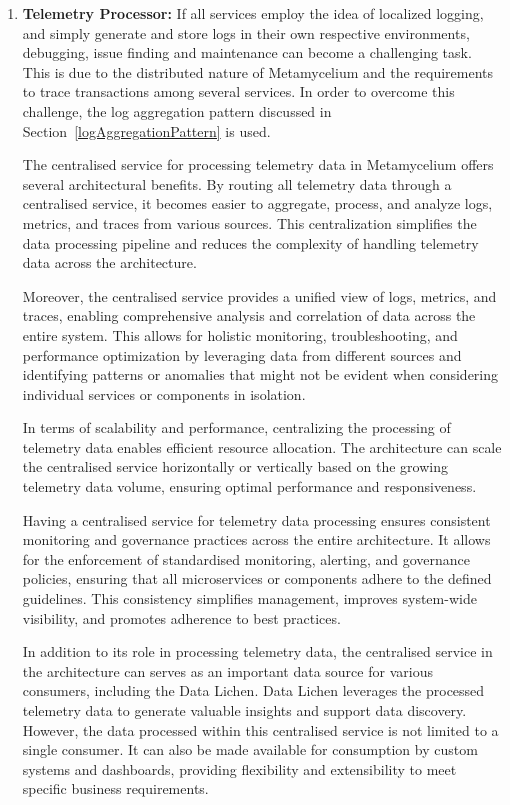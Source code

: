 \documentclass[preprint,12pt]{elsarticle}
\begin{document}
\begin{enumerate}
    \item \textbf{Telemetry Processor:} If all services employ the idea of localized logging, and simply generate and store logs in their own respective environments, debugging, issue finding and maintenance can become a challenging task. This is due to the distributed nature of Metamycelium and the requirements to trace transactions among several services. In order to overcome this challenge, the log aggregation pattern discussed in Section~\ref{logAggregationPattern} is used.
    
    The centralised service for processing telemetry data in Metamycelium offers several architectural benefits. By routing all telemetry data through a centralised service, it becomes easier to aggregate, process, and analyze logs, metrics, and traces from various sources. This centralization simplifies the data processing pipeline and reduces the complexity of handling telemetry data across the architecture.

    Moreover, the centralised service provides a unified view of logs, metrics, and traces, enabling comprehensive analysis and correlation of data across the entire system. This allows for holistic monitoring, troubleshooting, and performance optimization by leveraging data from different sources and identifying patterns or anomalies that might not be evident when considering individual services or components in isolation.

    In terms of scalability and performance, centralizing the processing of telemetry data enables efficient resource allocation. The architecture can scale the centralised service horizontally or vertically based on the growing telemetry data volume, ensuring optimal performance and responsiveness.

    Having a centralised service for telemetry data processing ensures consistent monitoring and governance practices across the entire architecture. It allows for the enforcement of standardised monitoring, alerting, and governance policies, ensuring that all microservices or components adhere to the defined guidelines. This consistency simplifies management, improves system-wide visibility, and promotes adherence to best practices.

    In addition to its role in processing telemetry data, the centralised service in the architecture can serves as an important data source for various consumers, including the Data Lichen. Data Lichen leverages the processed telemetry data to generate valuable insights and support data discovery. However, the data processed within this centralised service is not limited to a single consumer. It can also be made available for consumption by custom systems and dashboards, providing flexibility and extensibility to meet specific business requirements. 
    

\end{enumerate}
\end{document}
